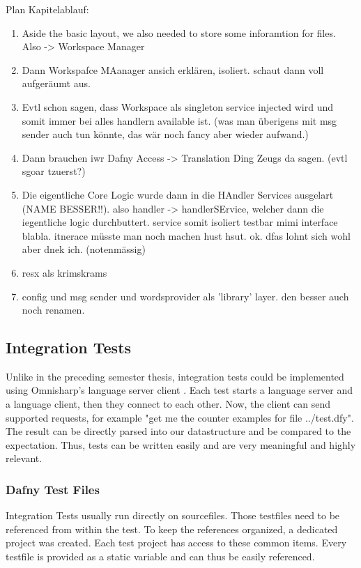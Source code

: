 Plan Kapitelablauf:
\begin{enumerate}
    \item Aside the basic layout, we also needed to store some inforamtion for files. Also -> Workspace Manager
    \item Dann Workspafce MAanager ansich erklären, isoliert. schaut dann voll aufgeräumt aus.
    \item Evtl schon sagen, dass Workspace als singleton service injected wird und somit immer bei alles handlern available ist. (was man überigens mit msg sender auch tun könnte, das wär noch fancy aber wieder aufwand.)
    \item Dann brauchen iwr Dafny Access -> Translation Ding Zeugs da sagen. (evtl sgoar tzuerst?)
    \item Die eigentliche Core Logic wurde dann in die HAndler Services ausgelart (NAME BESSER!!). also handler -> handlerSErvice, welcher dann die iegentliche logic durchbuttert. service somit isoliert testbar mimi interface blabla. itnerace müsste man noch machen hust hsut. ok. dfas lohnt sich wohl aber dnek ich. (notenmässig)
    \item resx als krimskrams
    \item config und msg sender und wordsprovider als 'library' layer. den besser auch noch renamen.
\end{enumerate}

\subsection{Integration Tests}
Unlike in the preceding semester thesis, integration tests could be implemented using Omnisharp's language server client \cite{omnisharpClient}. Each test starts a language server and a language client, then they connect to each other. Now, the client can send supported requests, for example "get me the counter examples for file ../test.dfy". The result can be directly parsed into our  datastructure and be compared to the expectation. Thus, tests can be written easily and are very meaningful and highly relevant.

\subsubsection{Dafny Test Files}
Integration Tests usually run directly on  sourcefiles. Those testfiles need to be referenced from within the test. To keep the references organized, a dedicated project  was created. Each test project has access to these common items. Every testfile is provided as a static variable and can thus be easily referenced.

